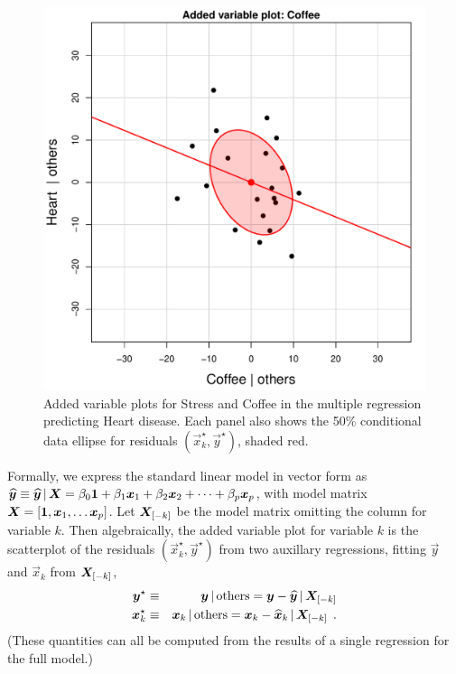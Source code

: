\begin{figure}[htb]
\begin{minipage}[b]{.49\linewidth}
  \includegraphics[width=1\linewidth]{fig/coffee-avplot2}
 \end{minipage}
  \caption{Added variable plots for Stress and Coffee in the multiple regression predicting Heart disease.
Each panel also shows the 50\% conditional data ellipse for residuals $(\vec{x}_k^\star, \vec{y}^\star)$, shaded red.
}
  \label{fig:coffee-avplot-A}
\end{figure}

Formally, we express the standard linear model in vector form as
$\widehat{\bm{y}} \equiv \widehat{\bm{y}} \, | \, \bm{X} = \beta_0 \bm{1} + \beta_1 \bm{x}_1 + \beta_2 \bm{x}_2 + \dots +  \beta_p \bm{x}_p$,
with model matrix $\mat{X} = [ \vec{1}, \vec{x}_1, \dots \vec{x}_p ]$.
Let $\bm{X}_{[-k]}$ be the model matrix omitting the column for variable $k$.
Then algebraically, the added variable plot for variable $k$ is the scatterplot of the residuals $(\vec{x}^\star_k, \vec{y}^\star)$ from
two auxillary regressions, fitting $\vec{y}$ and $\vec{x}_k$ from $\bm{X}_{[-k]}$,
\begin{eqnarray*}
 \bm{y}^\star   & \equiv & \bm{y} \, | \, \textrm{others}  =  \bm{y} - \widehat{\bm{y}} \, | \, \bm{X}_{[-k]} \\
 \bm{x}^\star_k & \equiv & \bm{x}_k \, | \, \textrm{others}  =  \bm{x}_k - \widehat{\bm{x}}_k \, | \, \bm{X}_{[-k]}  \:\: . \\
\end{eqnarray*}
(These quantities can all be computed \citep{VellemanWelsh:81} from the results of a single regression for the full model.)

